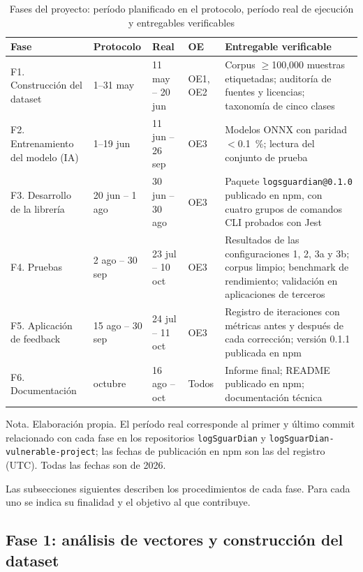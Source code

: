 \begin{table}[H]
\centering
\small
\begin{tabular}{|L{2.6cm}|L{1.9cm}|L{2.1cm}|L{1.2cm}|L{4.6cm}|}
\hline
\textbf{Fase} & \textbf{Protocolo} & \textbf{Real} & \textbf{OE} & \textbf{Entregable verificable} \\ \hline
F1. Construcción del dataset & 1--31 may & 11 may -- 20 jun & OE1, OE2 & Corpus $\geq$100{,}000
muestras etiquetadas; auditoría de fuentes y licencias; taxonomía de cinco clases \\ \hline
F2. Entrenamiento del modelo (IA) & 1--19 jun & 11 jun -- 26 sep & OE3 & Modelos ONNX con paridad
$<$0.1~\%; lectura del conjunto de prueba \\ \hline
F3. Desarrollo de la librería & 20 jun -- 1 ago & 30 jun -- 30 ago & OE3 & Paquete
\texttt{logsguardian@0.1.0} publicado en npm, con cuatro grupos de comandos CLI probados con
Jest \\ \hline
F4. Pruebas & 2 ago -- 30 sep & 23 jul -- 10 oct & OE3 & Resultados de las configuraciones 1, 2,
3a y 3b; corpus limpio; benchmark de rendimiento; validación en aplicaciones de terceros \\ \hline
F5. Aplicación de feedback & 15 ago -- 30 sep & 24 jul -- 11 oct & OE3 & Registro de iteraciones
con métricas antes y después de cada corrección; versión 0.1.1 publicada en npm \\ \hline
F6. Documentación & octubre & 16 ago -- oct & Todos & Informe final; README publicado en npm;
documentación técnica \\ \hline
\end{tabular}
\caption[Fases del proyecto: período planificado y real]{Fases del proyecto: período planificado en el protocolo, período real de ejecución y entregables verificables}
\label{tab:met-fases}
\end{table}
{\footnotesize Nota. Elaboración propia. El período real corresponde al primer y último commit
relacionado con cada fase en los repositorios \texttt{logSguarDian} y
\texttt{logSguarDian-vulnerable-project}; las fechas de publicación en npm son las del registro
(UTC). Todas las fechas son de 2026.}

Las subsecciones siguientes describen los procedimientos de cada fase. Para cada uno se indica
su finalidad y el objetivo al que contribuye.

\subsection{Fase 1: análisis de vectores y construcción del dataset}
\label{subsec:met-f1}

